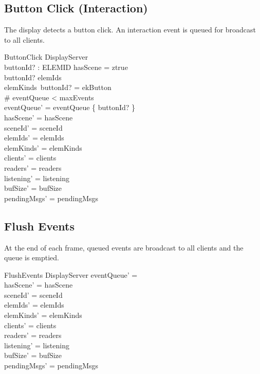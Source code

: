 \documentclass[a4paper,10pt,fleqn]{article}
\begin{document}
\subsection{Button Click (Interaction)}

The display detects a button click.  An interaction event is queued
for broadcast to all clients.

\begin{schema}{ButtonClick}
  \Delta DisplayServer \\
  buttonId? : ELEMID
  \where
  hasScene = ztrue \\
  buttonId? \in elemIds \\
  elemKinds~buttonId? = ekButton \\
  \# eventQueue < maxEvents \\
  eventQueue' = eventQueue \cup \{ buttonId? \} \\
  hasScene' = hasScene \\
  sceneId' = sceneId \\
  elemIds' = elemIds \\
  elemKinds' = elemKinds \\
  clients' = clients \\
  readers' = readers \\
  listening' = listening \\
  bufSize' = bufSize \\
  pendingMsgs' = pendingMsgs
\end{schema}

\subsection{Flush Events}

At the end of each frame, queued events are broadcast to all
clients and the queue is emptied.

\begin{schema}{FlushEvents}
  \Delta DisplayServer
  \where
  eventQueue' = \emptyset \\
  hasScene' = hasScene \\
  sceneId' = sceneId \\
  elemIds' = elemIds \\
  elemKinds' = elemKinds \\
  clients' = clients \\
  readers' = readers \\
  listening' = listening \\
  bufSize' = bufSize \\
  pendingMsgs' = pendingMsgs
\end{schema}
\end{document}
